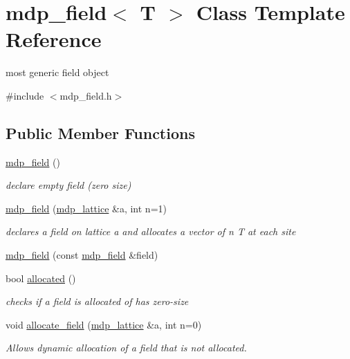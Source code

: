 \hypertarget{classmdp__field}{}\section{mdp\+\_\+field$<$ T $>$ Class Template Reference}
\label{classmdp__field}


most generic field object  




{\ttfamily \#include $<$mdp\+\_\+field.\+h$>$}

\subsection*{Public Member Functions}
\begin{DoxyCompactItemize}
\item 
\hyperlink{classmdp__field_ab3e16ee58db96391a255579bc89d8535}{mdp\+\_\+field} ()
\begin{DoxyCompactList}\small\item\em declare empty field (zero size) \end{DoxyCompactList}\item 
\hyperlink{classmdp__field_aaae273c82d9b0931e31f7265d5ca2652}{mdp\+\_\+field} (\hyperlink{classmdp__lattice}{mdp\+\_\+lattice} \&a, int n=1)
\begin{DoxyCompactList}\small\item\em declares a field on lattice a and allocates a vector of n T at each site \end{DoxyCompactList}\item 
\hyperlink{classmdp__field_a0f143d8cceb191d24cf72025091a03a9}{mdp\+\_\+field} (const \hyperlink{classmdp__field}{mdp\+\_\+field} \&field)
\item 
bool \hyperlink{classmdp__field_ad306195eb4961253cef69e5fb33bce69}{allocated} ()
\begin{DoxyCompactList}\small\item\em checks if a field is allocated of has zero-\/size \end{DoxyCompactList}\item 
void \hyperlink{classmdp__field_ab76ac5e0273aa3e1b5070fc3d7a0dc84}{allocate\+\_\+field} (\hyperlink{classmdp__lattice}{mdp\+\_\+lattice} \&a, int n=0)
\begin{DoxyCompactList}\small\item\em Allows dynamic allocation of a field that is not allocated. \end{DoxyCompactList}\item 

\end{DoxyCompactItemize}
